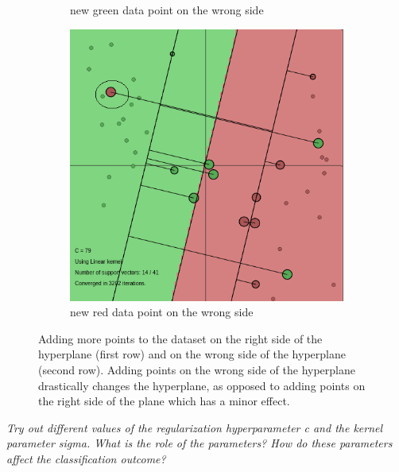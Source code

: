 \documentclass{article}
\begin{document}
\begin{figure}[]
\begin{subfigure}{0.33\linewidth}
            \caption{new green data point on the wrong side}
        \end{subfigure}
        \begin{subfigure}{0.33\linewidth}
            \includegraphics[width=\linewidth]{add5}
            \caption{new red data point on the wrong side}
        \end{subfigure}
   
        
	
        \caption{ Adding more points to the dataset on the right side of the hyperplane (first row) and on the wrong side of the hyperplane (second row). Adding points on the wrong side of the hyperplane drastically changes the hyperplane, as opposed to adding points on the right side of the plane which has a minor effect.}        
        
                
        
        \label{fig:adding}
    \end{figure}



\textit{Try out different values of the regularization hyperparameter c and the kernel
parameter sigma. What is the role of the parameters? How do these parameters
affect the classification outcome?}
\end{document}
